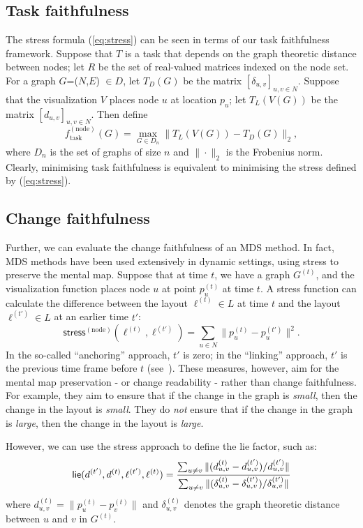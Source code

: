 \documentclass[10pt,journal,cspaper,compsoc]{IEEEtran}
\newcommand{\lie}{\textsf{lie}}
\newcommand{\stress}{\textsf{stress}}
\begin{document}
\subsection{Task faithfulness}
The stress formula (\ref{eq:stress}) can be seen in terms of our task faithfulness framework.
Suppose that $T$ is a task that depends on the graph theoretic distance between nodes; let $R$ be the set of real-valued matrices indexed on the node set. For a graph $G$=($N$,$E$) $\in D$, let $T_D(G)$ be the matrix $[ \delta_{u,v} ]_{u,v \in N}$. Suppose that the visualization $V$ places node $u$ at location $p_u$; let $T_L (V(G))$ be the matrix $[ d_{u,v} ]_{u,v \in N}$. Then define
\begin{equation}
f_\text{task}^{(\text{node})}(G)= \max_{G \in D_n} \| T_L(V(G)) - T_D(G) \|_2 ,
\end{equation}
where $D_n$ is the set of graphs of size $n$ and $\| \cdot \|_2$ is the Frobenius norm. Clearly, minimising task faithfulness is equivalent to minimising the stress defined by (\ref{eq:stress}).

\subsection{Change faithfulness}
Further, we can evaluate the change faithfulness of an MDS method. In fact, MDS methods have been used extensively in dynamic settings, using stress to preserve the mental map. Suppose that at time $t$, we have a graph $G^{(t)}$, and the visualization function places node $u$ at point $p^{(t)}_u$ at time $t$.
A stress function can calculate the difference between the layout $\ell^{(t)}  \in L$ at time $t$ and the layout $\ell^{(t')}  \in L$ at an earlier time $t'$:
\begin{equation*}
\stress^{(\text{node})}(\ell^{(t)}, \ell^{(t')})= \sum_{u \in N}{ \| p^{(t)}_u - p^{(t')}_u \| ^2}.
\end{equation*}
In the so-called ``anchoring'' approach, $t'$ is zero; in the ``linking'' approach, $t'$ is the previous time frame before $t$ (see~\cite{brandes2012quantitative}).
These measures, however, aim for the mental map preservation - or change readability - rather than change faithfulness. For example, they aim to ensure that if the change in the graph is \emph{small}, then the change in the layout is \emph{small}. They do \emph{not} ensure that if the change in the graph is \emph{large}, then the change in the layout is \emph{large}.

However, we can use the stress approach to define the lie factor, such as:
\begin{equation*}
\lie (d^{(t')},d^{(t)},  \ell^{(t')}, \ell^{(t)})=  
 \frac{ \sum_{u\neq v}{ \| (d^{(t)}_{u,v} - d^{(t')}_{u,v} )/ d^{(t')}_{u,v} \| } } { \sum_{u\neq v}{ \| (\delta^{(t)}_{u,v} - \delta^{(t')}_{u,v} )/ \delta^{(t')}_{u,v} } \| }\label{eqn:changefaith_mds_sumoversum}\\
\end{equation*}
where $d^{(t)}_{u,v} = \| p^{(t)}_u - p^{(t)}_v \|$ and $\delta^{(t)}_{u,v}$ denotes the graph theoretic distance between $u$ and $v$ in $G^{(t)}$.
\end{document}
